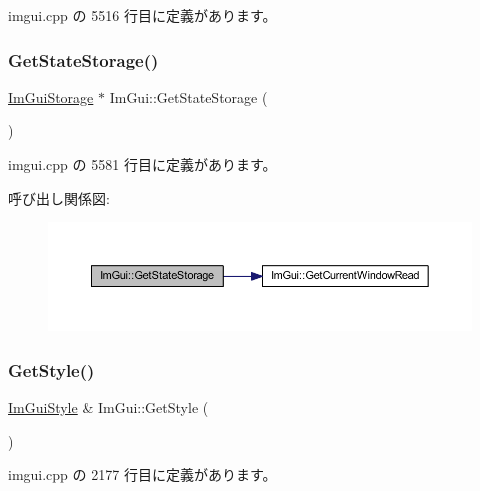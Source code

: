  imgui.\+cpp の 5516 行目に定義があります。

\mbox{\label{namespace_im_gui_aa2b8fa1a5320cd70f23a53d8fe604fb2}} 
\subsubsection{\texorpdfstring{Get\+State\+Storage()}{GetStateStorage()}}
{\footnotesize\ttfamily \mbox{\hyperlink{struct_im_gui_storage}{Im\+Gui\+Storage}} $\ast$ Im\+Gui\+::\+Get\+State\+Storage (\begin{DoxyParamCaption}{ }\end{DoxyParamCaption})}



 imgui.\+cpp の 5581 行目に定義があります。

呼び出し関係図\+:\nopagebreak
\begin{figure}[H]
\begin{center}
\leavevmode
\includegraphics[width=350pt]{namespace_im_gui_aa2b8fa1a5320cd70f23a53d8fe604fb2_cgraph}
\end{center}
\end{figure}
\mbox{\label{namespace_im_gui_abafef4bb3e3654efd96a47b2e22870a7}} 
\subsubsection{\texorpdfstring{Get\+Style()}{GetStyle()}}
{\footnotesize\ttfamily \mbox{\hyperlink{struct_im_gui_style}{Im\+Gui\+Style}} \& Im\+Gui\+::\+Get\+Style (\begin{DoxyParamCaption}{ }\end{DoxyParamCaption})}



 imgui.\+cpp の 2177 行目に定義があります。

